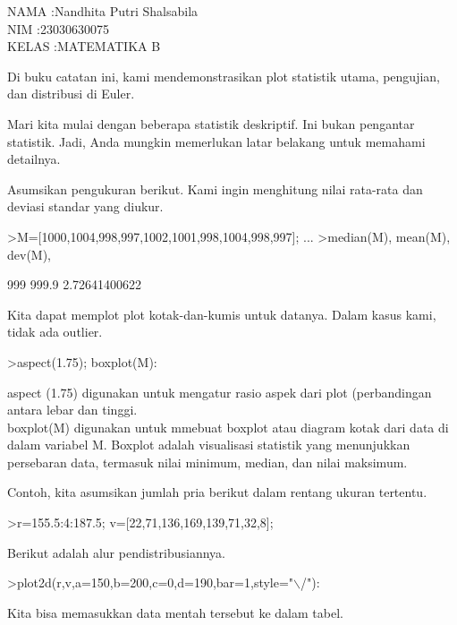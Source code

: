 \documentclass{article}
\begin{document}
\begin{eulernotebook}
\eulersubheading{}
\begin{eulercomment}
NAMA  :Nandhita Putri Shalsabila\\
NIM   :23030630075\\
KELAS :MATEMATIKA B\\
\end{eulercomment}
\eulersubheading{}
\begin{eulercomment}
\begin{eulercomment}
\begin{eulercomment}
Di buku catatan ini, kami mendemonstrasikan plot statistik utama,
pengujian, dan distribusi di Euler.

Mari kita mulai dengan beberapa statistik deskriptif. Ini bukan
pengantar statistik. Jadi, Anda mungkin memerlukan latar belakang
untuk memahami detailnya.

Asumsikan pengukuran berikut. Kami ingin menghitung nilai rata-rata
dan deviasi standar yang diukur.
\end{eulercomment}
\begin{eulerprompt}
>M=[1000,1004,998,997,1002,1001,998,1004,998,997]; ...
>median(M), mean(M), dev(M),
\end{eulerprompt}
\begin{euleroutput}
  999
  999.9
  2.72641400622
\end{euleroutput}
\begin{eulercomment}
Kita dapat memplot plot kotak-dan-kumis untuk datanya. Dalam kasus
kami, tidak ada outlier.
\end{eulercomment}
\begin{eulerprompt}
>aspect(1.75); boxplot(M):
\end{eulerprompt}
\begin{eulercomment}
aspect (1.75) digunakan untuk mengatur rasio aspek dari plot
(perbandingan antara lebar dan tinggi.\\
boxplot(M) digunakan untuk mmebuat boxplot atau diagram kotak dari
data di dalam variabel M. Boxplot adalah visualisasi statistik yang
menunjukkan persebaran data, termasuk nilai minimum, median, dan nilai
maksimum.

Contoh, kita asumsikan jumlah pria berikut dalam rentang ukuran
tertentu.
\end{eulercomment}
\begin{eulerprompt}
>r=155.5:4:187.5; v=[22,71,136,169,139,71,32,8];
\end{eulerprompt}
\begin{eulercomment}
Berikut adalah alur pendistribusiannya.
\end{eulercomment}
\begin{eulerprompt}
>plot2d(r,v,a=150,b=200,c=0,d=190,bar=1,style="\(\backslash\)/"):
\end{eulerprompt}
\begin{eulercomment}
Kita bisa memasukkan data mentah tersebut ke dalam tabel.


\end{eulercomment}
\end{eulercomment}
\end{eulercomment}
\end{eulernotebook}
\end{document}
